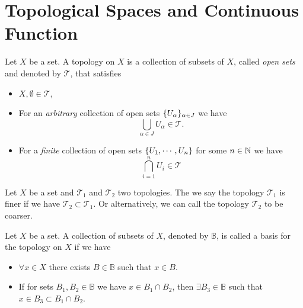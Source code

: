 \chapter{Topological Spaces and Continuous Function}

\begin{definition}
	Let $ X $ be a set. A topology on $ X $ is a collection of subsets of $ X $, called \emph{open sets} and denoted by $ \mathcal{T} $, that satisfies
	\begin{itemize}[noitemsep]
		\item $ X,\emptyset \in \mathcal{T} $,
		\item For an \emph{arbitrary} collection of open sets $ \{U_\alpha\}_{\alpha \in J} $ we have
		\[ \bigcup_{\alpha\in J} U_\alpha \in \mathcal{T}. \]
		\item For a \emph{finite} collection of open sets $ \{U_1,\cdots,U_n\} $ for some $ n\in \mathbb{N} $ we have
		\[ \bigcap_{i=1}^n U_i \in \mathcal{T} \]
	\end{itemize}
\end{definition}

\begin{definition}
	\label{def:finer_and_coarse_topol}
	Let $ X $ be a set and $ \mathcal{T}_1 $ and $ \mathcal{T}_2 $ two topologies. The we say the topology $ \mathcal{T}_1 $ is finer if we have $ \mathcal{T_2} \subset \mathcal{T_1} $. Or alternatively, we can call the topology $ \mathcal{T}_2 $ to be coarser.
\end{definition}

\begin{definition}
	Let $ X $ be a set. A collection of subsets of $ X $, denoted by $ \mathbb{B} $, is called a basis for the topology on $ X $ if we have
	\begin{itemize}[noitemsep]
		\item $ \forall x \in X $ there exists $ B \in \mathbb{B} $ such that $ x \in B $.
		\item If for sets $ B_1,B_2 \in \mathbb{B} $ we have $ x \in B_1\cap B_2 $, then $ \exists B_3 \in \mathbb{B} $ such that $ x \in B_3 \subset B_1\cap B_2 $.
	\end{itemize}
\end{definition}

